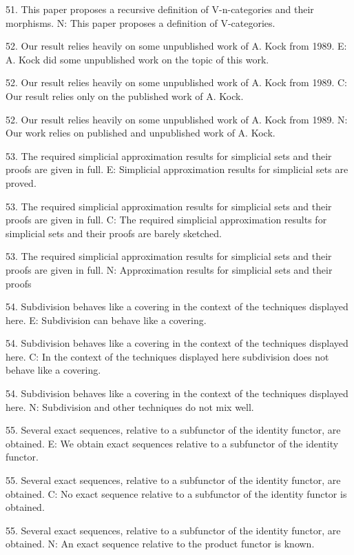 51. This paper proposes a recursive definition of V-n-categories and their morphisms.
N: This paper proposes a definition of V-categories.

52. Our result relies heavily on some unpublished work of A. Kock from 1989.
E:  A. Kock did some unpublished work on the topic of this work.

52. Our result relies heavily on some unpublished work of A. Kock from 1989.
C: Our result relies only on the published  work of A. Kock.

52. Our result relies heavily on some unpublished work of A. Kock from 1989.
N: Our work relies on published and unpublished work of A. Kock.

53. The required simplicial approximation results for simplicial sets and their proofs are given in full.
E: Simplicial approximation results for simplicial sets are proved.

53. The required simplicial approximation results for simplicial sets and their proofs are given in full.
C: The required simplicial approximation results for simplicial sets and their proofs are barely sketched.

53. The required simplicial approximation results for simplicial sets and their proofs are given in full.
N: Approximation results for simplicial sets and their proofs

54. Subdivision behaves like a covering in the context of the techniques displayed here.
E: Subdivision can behave like a covering.

54. Subdivision behaves like a covering in the context of the techniques displayed here.
C: In the context of the techniques displayed here subdivision does not behave like a covering.

54. Subdivision behaves like a covering in the context of the techniques displayed here.
N: Subdivision and other techniques do not mix well.

55. Several exact sequences, relative to a subfunctor of the identity functor, are obtained.
E: We obtain exact sequences relative to a subfunctor of the identity functor.

55. Several exact sequences, relative to a subfunctor of the identity functor, are obtained.
C: No exact sequence relative to a subfunctor of the identity functor is obtained.

55. Several exact sequences, relative to a subfunctor of the identity functor, are obtained.
N: An exact sequence relative to the product functor is known.

